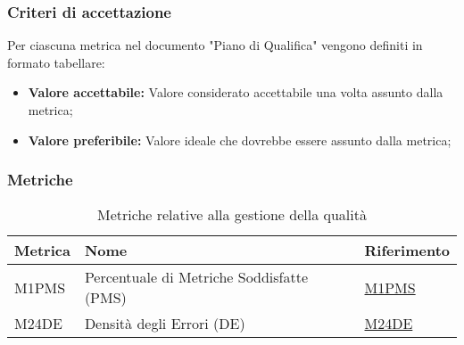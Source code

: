 \subsubsection{Criteri di accettazione}
Per ciascuna metrica nel documento "Piano di Qualifica" vengono definiti in formato tabellare:
\begin{itemize}
    \item \textbf{Valore accettabile:}
        Valore considerato accettabile una volta assunto dalla metrica;
    \item \textbf{Valore preferibile:}
        Valore ideale che dovrebbe essere assunto dalla metrica; 
\end{itemize}

\subsubsection{Metriche}
\begin{table}[H]
    \centering
    \begin{tabular}{|C{3cm}|C{3cm}|C{4cm}|}
    \hline
    Metrica & Nome & Riferimento\\
    \hline \hline
    M1PMS & Percentuale di Metriche Soddisfatte (PMS) &  \hyperlink{item:M1PMS}{\textcolor{linkcolor}{M1PMS}} \\
    M24DE & Densità degli Errori (DE) &  \hyperlink{item:M24DE}{\textcolor{linkcolor}{M24DE}} \\
    \hline
    \end{tabular}
    \caption{Metriche relative alla gestione della qualità}
\end{table}

